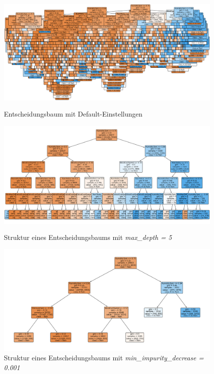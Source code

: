 \begin{figure}[H]
    \centering
         \begin{minipage}{0.31\textwidth}
		\centering
		\includegraphics[width = 1\textwidth]{Bilder/treedefault}
		\caption{Entscheidungsbaum mit Default-Einstellungen}
		\label{fig:treedefault}
    \end{minipage}\hfill
     \begin{minipage}{0.31\textwidth}
        \centering
        \includegraphics[width=1\textwidth]{Bilder/treeMaxDepth} %
        \caption{Struktur eines Entscheidungsbaums mit \emph{max\_depth = 5}}
        \label{fig:treeMaxDepth}
    \end{minipage}\hfill
    \begin{minipage}{0.31\textwidth}
        \centering
        \includegraphics[width=1\textwidth]{Bilder/treeMinImpurityDecrease} %
        \caption{Struktur eines Entscheidungsbaums mit \emph{min\_impurity\_decrease = 0.001}}
        \label{fig:treeMinImpurityDecrease}
    \end{minipage}\hfill
\end{figure}
